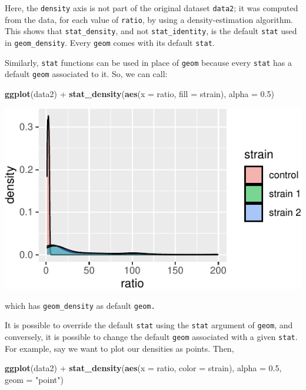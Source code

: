 \documentclass[]{book}
\newenvironment{Shaded}{}{}
\newcommand{\DataTypeTok}[1]{\textcolor[rgb]{0.56,0.13,0.00}{#1}}
\newcommand{\FloatTok}[1]{\textcolor[rgb]{0.25,0.63,0.44}{#1}}
\newcommand{\KeywordTok}[1]{\textcolor[rgb]{0.00,0.44,0.13}{\textbf{#1}}}
\newcommand{\NormalTok}[1]{#1}
\newcommand{\OperatorTok}[1]{\textcolor[rgb]{0.40,0.40,0.40}{#1}}
\newcommand{\StringTok}[1]{\textcolor[rgb]{0.25,0.44,0.63}{#1}}
\begin{document}
Here, the \texttt{density} axis is not part of the original dataset \texttt{data2}; it was computed from the data, for each value of \texttt{ratio}, by using a density-estimation algorithm. This shows that \texttt{stat\_density}, and not \texttt{stat\_identity}, is the default \texttt{stat} used in \texttt{geom\_density}. Every \texttt{geom} comes with its default \texttt{stat}.

Similarly, \texttt{stat} functions can be used in place of \texttt{geom} because every \texttt{stat} has a default \texttt{geom} associated to it. So, we can call:

\begin{Shaded}
\begin{Highlighting}[]
\KeywordTok{ggplot}\NormalTok{(data2) }\OperatorTok{+}
\StringTok{  }\KeywordTok{stat_density}\NormalTok{(}\KeywordTok{aes}\NormalTok{(}\DataTypeTok{x =}\NormalTok{ ratio, }\DataTypeTok{fill =}\NormalTok{ strain), }\DataTypeTok{alpha =} \FloatTok{0.5}\NormalTok{)}
\end{Highlighting}
\end{Shaded}

\begin{center}\includegraphics[width=\textwidth]{TRES-Tidy-Tutorial_files/figure-latex/unnamed-chunk-113-1} \end{center}

which has \texttt{geom\_density} as default \texttt{geom.}

It is possible to override the default \texttt{stat} using the \texttt{stat} argument of \texttt{geom}, and conversely, it is possible to change the default \texttt{geom} associated with a given \texttt{stat}. For example, say we want to plot our densities as points. Then,

\begin{Shaded}
\begin{Highlighting}[]
\KeywordTok{ggplot}\NormalTok{(data2) }\OperatorTok{+}
\StringTok{  }\KeywordTok{stat_density}\NormalTok{(}\KeywordTok{aes}\NormalTok{(}\DataTypeTok{x =}\NormalTok{ ratio, }\DataTypeTok{color =}\NormalTok{ strain), }\DataTypeTok{alpha =} \FloatTok{0.5}\NormalTok{, }\DataTypeTok{geom =} \StringTok{"point"}\NormalTok{)}
\end{Highlighting}
\end{Shaded}
\end{document}
